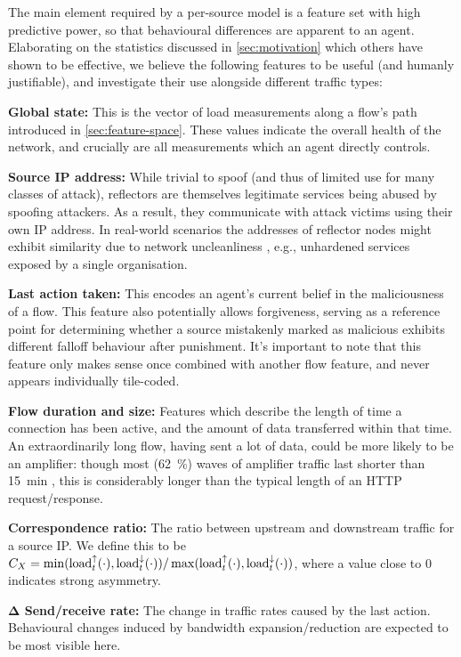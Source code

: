 \documentclass[10pt, times, comsoc]{IEEEtran}
\newcommand{\fakepara}[1]{\noindent\textbf{#1:}}
\begin{document}
The main element required by a per-source model is a feature set with high predictive power, so that behavioural differences are apparent to an agent.
Elaborating on the statistics discussed in \cref{sec:motivation} which others have shown to be effective, we believe the following features to be useful (and humanly justifiable), and investigate their use alongside different traffic types:

\fakepara{Global state}
This is the vector of load measurements along a flow's path introduced in \cref{sec:feature-space}.
These values indicate the overall health of the network, and crucially are all measurements which an agent directly controls.

\fakepara{Source IP address}
While trivial to spoof (and thus of limited use for many classes of attack), reflectors are themselves legitimate services being abused by spoofing attackers.
As a result, they communicate with attack victims using their own IP address.
In real-world scenarios the addresses of reflector nodes might exhibit similarity due to network uncleanliness \cite{DBLP:conf/imc/CollinsSFJWSK07}, e.g., unhardened services exposed by a single organisation.

\fakepara{Last action taken}
This encodes an agent's current belief in the maliciousness of a flow.
This feature also potentially allows forgiveness, serving as a reference point for determining whether a source mistakenly marked as malicious exhibits different falloff behaviour after punishment.
It's important to note that this feature only makes sense once combined with another flow feature, and never appears individually tile-coded.

\fakepara{Flow duration and size}
Features which describe the length of time a connection has been active, and the amount of data transferred within that time.
An extraordinarily long flow, having sent a lot of data, could be more likely to be an amplifier: though most (\SI{62}{\percent}) waves of amplifier traffic last shorter than \SI{15}{\minute} \cite{DBLP:conf/raid/KramerKMNKYR15}, this is considerably longer than the typical length of an HTTP request/response.

\fakepara{Correspondence ratio}
The ratio between upstream and downstream traffic for a source IP.
We define this to be $C_X = \min(\operatorname{load}^{\uparrow}_{t}(\cdot), \operatorname{load}^{\downarrow}_{t}(\cdot))/\max(\operatorname{load}^{\uparrow}_{t}(\cdot), \operatorname{load}^{\downarrow}_{t}(\cdot))$, where a value close to 0 indicates strong asymmetry.

\fakepara{$\mathbf{\Delta}$ Send/receive rate}
The change in traffic rates caused by the last action.
Behavioural changes induced by bandwidth expansion/reduction are expected to be most visible here.
\end{document}
